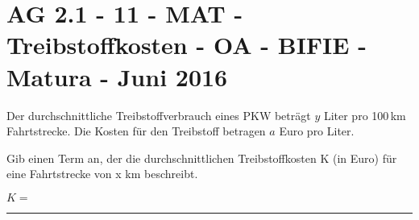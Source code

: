 \section{AG 2.1 - 11 - MAT - Treibstoffkosten - OA - BIFIE - Matura - Juni 2016}

\begin{beispiel}[AG 2.1]{1} %
Der durchschnittliche Treibstoffverbrauch eines PKW beträgt $y$ Liter pro 100\,km Fahrtstrecke.
Die Kosten für den Treibstoff betragen $a$ Euro pro Liter.\leer

Gib einen Term an, der die durchschnittlichen Treibstoffkosten K (in Euro) für eine Fahrtstrecke
von x km beschreibt. \leer

$K=$\rule{5cm}{0.3pt}

\end{beispiel}
